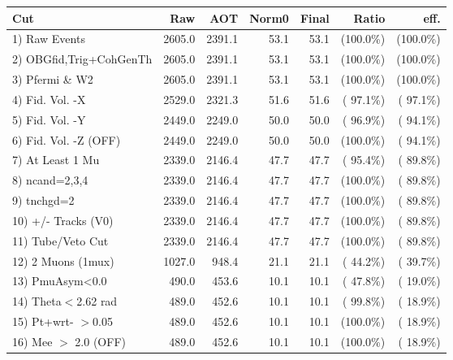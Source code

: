  \begin{table}[h!]\centering
 \begin{tabular}{||l||r|r|r|r|r|r||}
 \hline
 \hline
 Cut & Raw & AOT & Norm0 & Final & Ratio & eff.       \\
 \hline
  1) Raw Events           &       2605.0 &       2391.1 &         53.1 &         53.1 & (100.0\%) & (100.0\%) \\
  2) OBGfid,Trig+CohGenTh &       2605.0 &       2391.1 &         53.1 &         53.1 & (100.0\%) & (100.0\%) \\
  3) Pfermi \& W2         &       2605.0 &       2391.1 &         53.1 &         53.1 & (100.0\%) & (100.0\%) \\
  4) Fid. Vol. -X         &       2529.0 &       2321.3 &         51.6 &         51.6 & ( 97.1\%) & ( 97.1\%) \\
  5) Fid. Vol. -Y         &       2449.0 &       2249.0 &         50.0 &         50.0 & ( 96.9\%) & ( 94.1\%) \\
  6) Fid. Vol. -Z (OFF)   &       2449.0 &       2249.0 &         50.0 &         50.0 & (100.0\%) & ( 94.1\%) \\
  7) At Least 1 Mu        &       2339.0 &       2146.4 &         47.7 &         47.7 & ( 95.4\%) & ( 89.8\%) \\
  8) ncand=2,3,4          &       2339.0 &       2146.4 &         47.7 &         47.7 & (100.0\%) & ( 89.8\%) \\
  9) tnchgd=2             &       2339.0 &       2146.4 &         47.7 &         47.7 & (100.0\%) & ( 89.8\%) \\
 10) +/- Tracks (V0)      &       2339.0 &       2146.4 &         47.7 &         47.7 & (100.0\%) & ( 89.8\%) \\
 11) Tube/Veto Cut        &       2339.0 &       2146.4 &         47.7 &         47.7 & (100.0\%) & ( 89.8\%) \\
 12) 2 Muons (1mux)       &       1027.0 &        948.4 &         21.1 &         21.1 & ( 44.2\%) & ( 39.7\%) \\
 13) PmuAsym<0.0          &        490.0 &        453.6 &         10.1 &         10.1 & ( 47.8\%) & ( 19.0\%) \\
 14) Theta$<$2.62 rad     &        489.0 &        452.6 &         10.1 &         10.1 & ( 99.8\%) & ( 18.9\%) \\
 15) Pt+wrt- $>$0.05      &        489.0 &        452.6 &         10.1 &         10.1 & (100.0\%) & ( 18.9\%) \\
 16) Mee $>$ 2.0  (OFF)   &        489.0 &        452.6 &         10.1 &         10.1 & (100.0\%) & ( 18.9\%) \\

\end{tabular}
\end{table}
